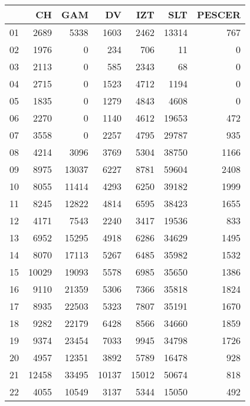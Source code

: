 \documentclass[12pt]{article}
\begin{document}
\begin{table}[ht]
\centering
\begin{tabular}{rrrrrrr}
  \hline
 & CH & GAM & DV & IZT & SLT & PESCER \\ 
  \hline
01 & 2689 & 5338 & 1603 & 2462 & 13314 & 767 \\ 
  02 & 1976 &   0 & 234 & 706 &  11 &   0 \\ 
  03 & 2113 &   0 & 585 & 2343 &  68 &   0 \\ 
  04 & 2715 &   0 & 1523 & 4712 & 1194 &   0 \\ 
  05 & 1835 &   0 & 1279 & 4843 & 4608 &   0 \\ 
  06 & 2270 &   0 & 1140 & 4612 & 19653 & 472 \\ 
  07 & 3558 &   0 & 2257 & 4795 & 29787 & 935 \\ 
  08 & 4214 & 3096 & 3769 & 5304 & 38750 & 1166 \\ 
  09 & 8975 & 13037 & 6227 & 8781 & 59604 & 2408 \\ 
  10 & 8055 & 11414 & 4293 & 6250 & 39182 & 1999 \\ 
  11 & 8245 & 12822 & 4814 & 6595 & 38423 & 1655 \\ 
  12 & 4171 & 7543 & 2240 & 3417 & 19536 & 833 \\ 
  13 & 6952 & 15295 & 4918 & 6286 & 34629 & 1495 \\ 
  14 & 8070 & 17113 & 5267 & 6485 & 35982 & 1532 \\ 
  15 & 10029 & 19093 & 5578 & 6985 & 35650 & 1386 \\ 
  16 & 9110 & 21359 & 5306 & 7366 & 35818 & 1824 \\ 
  17 & 8935 & 22503 & 5323 & 7807 & 35191 & 1670 \\ 
  18 & 9282 & 22179 & 6428 & 8566 & 34660 & 1859 \\ 
  19 & 9374 & 23454 & 7033 & 9945 & 34798 & 1726 \\ 
  20 & 4957 & 12351 & 3892 & 5789 & 16478 & 928 \\ 
  21 & 12458 & 33495 & 10137 & 15012 & 50674 & 818 \\ 
  22 & 4055 & 10549 & 3137 & 5344 & 15050 & 492 \\ 
   \hline
\end{tabular}
\end{table}
\end{document}
